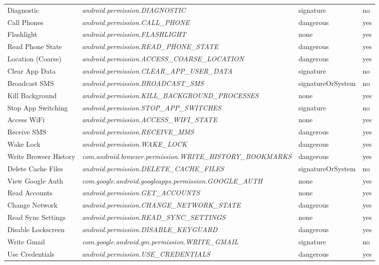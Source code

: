 \begin{small}
\begin{longtable}{p{3cm}|p{8cm}|p{2.5cm}|p{1.5cm}}
Diagnostic & \textit{android.permission.\-DIAGNOSTIC} & signature & no \\
Call Phones & \textit{android.permission.\-CALL\_PHONE} & dangerous & yes \\
Flashlight & \textit{android.permission.\-FLASHLIGHT} & none & yes \\
Read Phone State & \textit{android.permission.\-READ\_PHONE\_STATE} & dangerous & yes \\
Location (Coarse) & \textit{android.permission.\-ACCESS\_COARSE\_LOCATION} & dangerous & yes \\
Clear App Data & \textit{android.permission.\-CLEAR\_APP\_USER\_DATA} & signature & no \\
Broadcast SMS & \textit{android.permission.\-BROADCAST\_SMS} & signatureOrSystem & no \\
Kill Background & \textit{android.permission.\-KILL\_BACKGROUND\_PROCESSES} & none & yes \\
Stop App Switching & \textit{android.permission.\-STOP\_APP\_SWITCHES} & signature & no \\
Access WiFi & \textit{android.permission.\-ACCESS\_WIFI\_STATE} & none & yes \\
Receive SMS & \textit{android.permission.\-RECEIVE\_MMS} & dangerous & yes \\
Wake Lock & \textit{android.permission.\-WAKE\_LOCK} & dangerous & yes \\
Write Browser History & \textit{com.android.browser.permission.\-WRITE\_HISTORY\_BOOKMARKS} & dangerous & yes \\
Delete Cache Files & \textit{android.permission.\-DELETE\_CACHE\_FILES} & signatureOrSystem & no \\
View Google Auth & \textit{com.google.android.googleapps.permission.\-GOOGLE\_AUTH} & none & yes \\
Read Accounts & \textit{android.permission.\-GET\_ACCOUNTS} & none & yes \\
Change Network & \textit{android.permission.\-CHANGE\_NETWORK\_STATE} & dangerous & yes \\
Read Sync Settings & \textit{android.permission.\-READ\_SYNC\_SETTINGS} & none & yes \\
Disable Lockscreen & \textit{android.permission.\-DISABLE\_KEYGUARD} & dangerous & yes \\
Write Gmail & \textit{com.google.android.gm.permission.\-WRITE\_GMAIL} & signature & no \\
Use Credentials & \textit{android.permission.\-USE\_CREDENTIALS} & dangerous & yes \\

\end{longtable}
\end{small}
